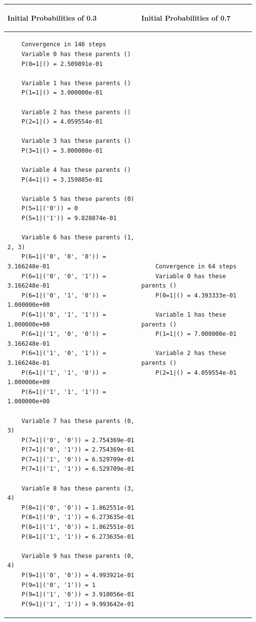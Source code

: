 \documentclass{article}
\begin{document}
\begin{center}
\begin{tabular}{|p{7cm}|p{7cm}|}
	\hline
	\begin{center}
		\textbf{Initial Probabilities of 0.3}
	\end{center}
	& 
	\begin{center}
		\textbf{Initial Probabilities of 0.7}
	\end{center}
	\\
	\hline
	\begin{verbatim}
	Convergence in 146 steps 
	Variable 0 has these parents ()
	P(0=1|() = 2.509891e-01 
	
	Variable 1 has these parents ()
	P(1=1|() = 3.000000e-01 
	
	Variable 2 has these parents ()
	P(2=1|() = 4.059554e-01 
	
	Variable 3 has these parents ()
	P(3=1|() = 3.000000e-01 
	
	Variable 4 has these parents ()
	P(4=1|() = 3.159885e-01 
	
	Variable 5 has these parents (0)
	P(5=1|('0')) = 0 
	P(5=1|('1')) = 9.828874e-01 
	
	Variable 6 has these parents (1, 2, 3)
	P(6=1|('0', '0', '0')) = 3.166248e-01 
	P(6=1|('0', '0', '1')) = 3.166248e-01 
	P(6=1|('0', '1', '0')) = 1.000000e+00 
	P(6=1|('0', '1', '1')) = 1.000000e+00 
	P(6=1|('1', '0', '0')) = 3.166248e-01 
	P(6=1|('1', '0', '1')) = 3.166248e-01 
	P(6=1|('1', '1', '0')) = 1.000000e+00 
	P(6=1|('1', '1', '1')) = 1.000000e+00 
	
	Variable 7 has these parents (0, 3)
	P(7=1|('0', '0')) = 2.754369e-01 
	P(7=1|('0', '1')) = 2.754369e-01 
	P(7=1|('1', '0')) = 6.529709e-01 
	P(7=1|('1', '1')) = 6.529709e-01 
	
	Variable 8 has these parents (3, 4)
	P(8=1|('0', '0')) = 1.862551e-01 
	P(8=1|('0', '1')) = 6.273635e-01 
	P(8=1|('1', '0')) = 1.862551e-01 
	P(8=1|('1', '1')) = 6.273635e-01 
	
	Variable 9 has these parents (0, 4)
	P(9=1|('0', '0')) = 4.993921e-01 
	P(9=1|('0', '1')) = 1 
	P(9=1|('1', '0')) = 3.910056e-01 
	P(9=1|('1', '1')) = 9.993642e-01\end{verbatim} & \begin{verbatim}
	Convergence in 64 steps 
	Variable 0 has these parents ()
	P(0=1|() = 4.393333e-01 
	
	Variable 1 has these parents ()
	P(1=1|() = 7.000000e-01 
	
	Variable 2 has these parents ()
	P(2=1|() = 4.059554e-01 
	

\end{verbatim}
\end{tabular}
\end{center}
\end{document}
